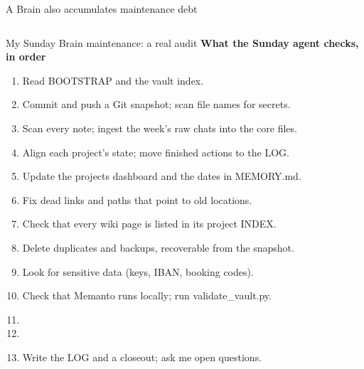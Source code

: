 \begin{frame}{A Brain also accumulates maintenance debt}
\begin{columns}[c,onlytextwidth]
\end{columns}\vspace{1mm}
\begin{columns}[c,onlytextwidth]
\end{columns}\vspace{1mm}
\end{frame}

\begin{frame}{My Sunday Brain maintenance: a real audit}
{\small\bfseries What the Sunday agent checks, in order}\par\vspace{0.35em}
\begin{enumerate}\setlength{\itemsep}{0.18em}\small
\item Read BOOTSTRAP and the vault index.
\item Commit and push a Git snapshot; scan file names for secrets.
\item Scan every note; ingest the week's raw chats into the core files.
\item Align each project's state; move finished actions to the LOG.
\item Update the projects dashboard and the dates in MEMORY.md.
\item Fix dead links and paths that point to old locations.
\item Check that every wiki page is listed in its project INDEX.
\item Delete duplicates and backups, recoverable from the snapshot.
\item Look for sensitive data (keys, IBAN, booking codes).
\item Check that Memanto runs locally; run validate\_vault.py.
\item {}
\item {}
\item Write the LOG and a closeout; ask me open questions.
\end{enumerate}
\end{frame}

